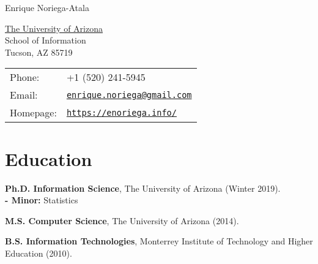 \documentclass[letterpaper]{article}
\def\name{Enrique Noriega-Atala}
\renewenvironment{itemize}{
  \begin{list}{}{
    \setlength{\leftmargin}{1.5em}
  }
}{
  \end{list}
}
\begin{document}
{\huge \name}


\vspace{0.25in}

\begin{minipage}{0.45\linewidth}
  \href{http://www.unc.edu/}{The University of Arizona} \\
  School of Information \\
  Tucson, AZ 85719
\end{minipage}
\begin{minipage}{0.45\linewidth}
  \begin{tabular}{ll}
    Phone: & +1 (520) 241-5945 \\
    Email: & \href{mailto:enrique.noriega@gmail.com}{\tt enrique.noriega@gmail.com} \\
    Homepage: & \href{https://enoriega.info/}{\tt https://enoriega.info/} \\
  \end{tabular}
\end{minipage}


%


\section*{Education}

\begin{itemize}
  \item \textbf{Ph.D. Information Science}, The University of Arizona (Winter 2019). \\
     \textbf{- Minor:} Statistics
  \item \textbf{M.S. Computer Science}, The University of Arizona (2014).
  \item \textbf{B.S. Information Technologies}, Monterrey Institute of Technology and Higher Education (2010).
\end{itemize}
\end{document}
